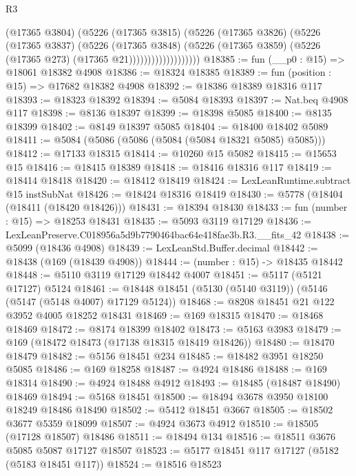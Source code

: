 \begin{lexlean}{R3}
\begin{coremodule}
                            (@17365 @3804)
                            (@5226
                              (@17365 @3815)
                              (@5226
                                (@17365 @3826)
                                (@5226
                                  (@17365 @3837)
                                  (@5226
                                    (@17365 @3848)
                                    (@5226
                                      (@17365 @3859)
                                      (@5226 (@17365 @273) (@17365 @21)))))))))))))))))))
@18385 := fun (__p0 : @15) => @18061 @18382 @4908
@18386 := @18324 @18385
@18389 := fun (position : @15) => @17682 @18382 @4908
@18392 := @18386 @18389 @18316 @117
@18393 := @18323 @18392
@18394 := @5084 @18393
@18397 := Nat.beq @4908 @117
@18398 := @8136 @18397
@18399 := @18398 @5085
@18400 := @8135 @18399
@18402 := @8149 @18397 @5085
@18404 := @18400 @18402 @5089
@18411 := @5084 (@5086 (@5086 (@5084 (@5084 @18321 @5085) @5085)))
@18412 := @17133 @18315
@18414 := @10260 @15 @5082
@18415 := @15653 @15
@18416 := @18415 @18389
@18418 := @18416 @18316 @117
@18419 := @18414 @18418
@18420 := @18412 @18419
@18424 := LexLeanRuntime.subtract @15 instSubNat
@18426 := @18424 @18316 @18419
@18430 := @5778 (@18404 (@18411 (@18420 @18426)))
@18431 := @18394 @18430
@18433 := fun (number : @15) => @18253 @18431
@18435 := @5093 @3119 @17129
@18436 := LexLeanPreserve.C018956a5d9b7790464bac64e418fae3b.R3.__fits_42
@18438 := @5099 (@18436 @4908)
@18439 := LexLeanStd.Buffer.decimal
@18442 := @18438 (@169 (@18439 @4908))
@18444 := (number : @15) -> @18435 @18442
@18448 := @5110 @3119 @17129 @18442 @4007
@18451 := @5117 (@5121 @17127) @5124
@18461 := @18448 @18451 (@5130 (@5140 @3119)) (@5146 (@5147 (@5148 @4007) @17129 @5124))
@18468 := @8208 @18451 @21 @122 @3952 @4005 @18252 @18431
@18469 := @169 @18315
@18470 := @18468 @18469
@18472 := @8174 @18399 @18402
@18473 := @5163 @3983
@18479 := @169 (@18472 @18473 (@17138 @18315 @18419 @18426))
@18480 := @18470 @18479
@18482 := @5156 @18451 @234
@18485 := @18482 @3951 @18250 @5085
@18486 := @169 @18258
@18487 := @4924 @18486
@18488 := @169 @18314
@18490 := @4924 @18488 @4912
@18493 := @18485 (@18487 @18490) @18469
@18494 := @5168 @18451
@18500 := @18494 @3678 @3950 @18100 @18249 @18486 @18490
@18502 := @5412 @18451 @3667
@18505 := @18502 @3677 @5359 @18099
@18507 := @4924 @3673 @4912
@18510 := @18505 (@17128 @18507) @18486
@18511 := @18494 @134
@18516 := @18511 @3676 @5085 @5087 @17127 @18507
@18523 := @5177 @18451 @117 @17127 (@5182 (@5183 @18451 @117))
@18524 := @18516 @18523

\end{coremodule}
\end{lexlean}
